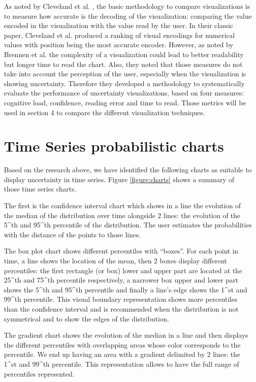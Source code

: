 \documentclass[a4paper,3p,sort&compress]{elsarticle}
\begin{document}
As noted by Cleveland et al. \cite{cleveland_graphical_1984}, the basic methodology to compare visualizations is to measure how accurate is the 
decoding of the visualization: comparing the value encoded in the visualization with the value read
by the user. In their classic paper, Cleveland et al. \cite{cleveland_graphical_1984} produced a ranking of visual encodings for numerical values 
with position being the most accurate encoder. However, as noted by Brennen et al. \cite{brennen_instrument_2018}
the complexity of a visualization could lead to better readability but longer time to read the chart. Also, 
they noted that those measures do not take into account the perception of the user, especially when the visualization
is showing uncertainty. Therefore they developed a methodology 
to systematically evaluate the performance of uncertainty visualizations, based on four measures: 
cognitive load, confidence, reading error and time to read. Those metrics will be used in section 4 to compare the different 
visualization techniques.

\section{Time Series probabilistic charts}  
\label{sec:time_series}

Based on the research above, we have identified the following charts as suitable to display 
uncertainty in time series. Figure \ref{figure:charts} shows a summary of those time series charts.

The first is the confidence interval chart  which shows in a line the evolution of the 
median of the distribution
 over time alongside 2 lines: the evolution of the 5^th and 95^th percentile of the distribution. 
 The user estimates the probabilities with the distance of the points to those lines.

The box plot chart shows different percentiles with “boxes”. For each point in time, a 
line shows the location of the mean, then 2 boxes display different percentiles: the
first rectangle (or box) lower and upper part are located 
at the 25^th and 75^th percentile respectively, a narrower box upper and lower part shows 
the 5^th and 95^th percentile and finally a line’s edge shows the 1^st and 99^th percentile. 
This visual boundary representation shows more percentiles than the confidence interval and 
is recommended when the distribution is not symmetrical and to show the edges of the distribution.

The gradient chart shows the evolution of the median in a line and then displays the different percentiles
with overlapping areas whose color corresponds to the percentile. We end up having an area with a gradient 
delimited by 2 lines: the 1^st and 99^th percentile. This representation allows to have the
 full range of percentiles represented.
\end{document}
